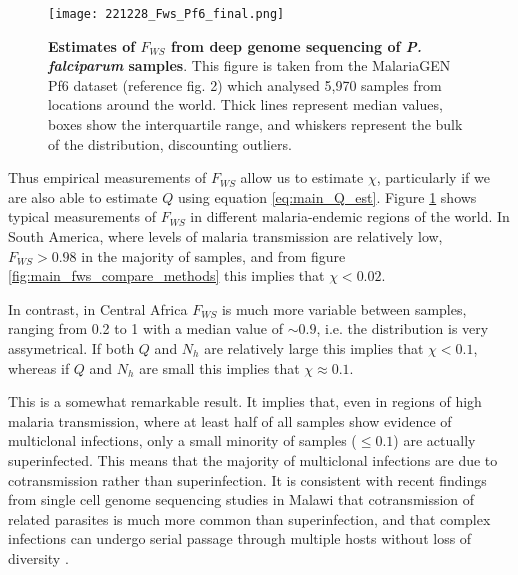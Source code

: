 \documentclass[_main.tex]{subfiles}
\begin{document}

\begin{figure}[h!]
\centering
\texttt{[image: 221228\_Fws\_Pf6\_final.png]}
\caption{\textbf{Estimates of $F_{WS}$ from deep genome sequencing of \textit{P. falciparum} samples}.  This figure is taken from the MalariaGEN Pf6 dataset (reference \cite{MalariaGEN2021} fig. 2) which analysed 5,970 samples from locations around the world.  Thick lines represent median values, boxes show the interquartile range, and whiskers represent the bulk of the distribution, discounting outliers.  
}
\label{fig:Fws_Pf6_figure}
\end{figure}

Thus empirical measurements of $F_{WS}$ allow us to estimate $\chi$, particularly if we are also able to estimate $Q$ using equation \ref{eq:main_Q_est}.  Figure \ref{fig:Fws_Pf6_figure} shows typical measurements of $F_{WS}$ in different malaria-endemic regions of the world.  In South America, where levels of malaria transmission are relatively low, $F_{WS} > 0.98$ in the majority of samples, and from figure \ref{fig:main_fws_compare_methods} this implies that $\chi < 0.02$.  

In contrast, in Central Africa $F_{WS}$ is much more variable between samples, ranging from 0.2 to 1 with a median value of $\sim 0.9$, i.e. the distribution is very assymetrical.  If both $Q$ and $N_h$ are relatively large this implies that $\chi < 0.1$, whereas if $Q$ and $N_h$ are small this implies that $\chi \approx 0.1$. 

This is a somewhat remarkable result.  It implies that, even in regions of high malaria transmission, where at least half of all samples show evidence of multiclonal infections, only a small minority of samples ($\leq 0.1$) are actually superinfected.   This means that the majority of multiclonal infections are due to cotransmission rather than superinfection.  It is consistent with recent findings from single cell genome sequencing studies in Malawi that cotransmission of related parasites is much more common than superinfection, and that complex infections can undergo serial passage through multiple hosts without loss of diversity \cite{Nkhoma2020}.
\end{document}
